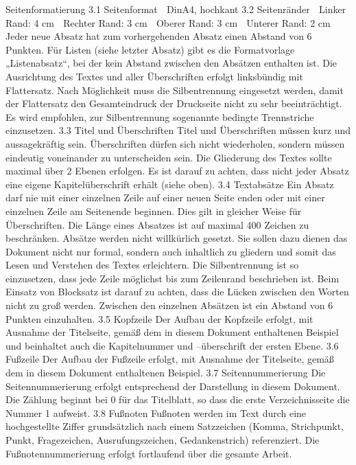 	Seitenformatierung
	3.1	Seitenformat
		DinA4, hochkant
	3.2	Seitenränder
		Linker Rand:   4 cm
		Rechter Rand:   3 cm
		Oberer Rand:   3 cm
		Unterer Rand:   2 cm
	Jeder neue Absatz hat zum vorhergehenden Absatz einen Abstand von 6 Punkten. Für Listen (siehe letzter Absatz) gibt es die Formatvorlage „Listenabsatz“, bei der kein Abstand zwischen den Absätzen enthalten ist.
	Die Ausrichtung des Textes und aller Überschriften erfolgt linksbündig mit Flattersatz. Nach Möglichkeit muss die Silbentrennung eingesetzt werden, damit der Flattersatz den Gesamteindruck der Druckseite nicht zu sehr beeinträchtigt. Es wird empfohlen, zur Silbentrennung sogenannte bedingte Trennstriche einzusetzen.
	3.3	Titel und Überschriften
	Titel und Überschriften müssen kurz und aussagekräftig sein. Überschriften dürfen sich nicht wiederholen, sondern müssen eindeutig voneinander zu unterscheiden sein.
	Die Gliederung des Textes sollte maximal über 2 Ebenen erfolgen. Es ist darauf zu achten, dass nicht jeder Absatz eine eigene Kapitelüberschrift erhält (siehe oben).
	3.4	Textabsätze
	Ein Absatz darf nie mit einer einzelnen Zeile auf einer neuen Seite enden oder mit einer einzelnen Zeile am Seitenende beginnen. Dies gilt in gleicher Weise für Überschriften.
	Die Länge eines Absatzes ist auf maximal 400 Zeichen zu beschränken.
	Absätze werden nicht willkürlich gesetzt. Sie sollen dazu dienen das Dokument nicht nur formal, sondern auch inhaltlich zu gliedern und somit das Lesen und Verstehen des Textes erleichtern.
	Die Silbentrennung ist so einzusetzen, dass jede Zeile möglichst bis zum Zeilenrand beschrieben ist. Beim Einsatz von Blocksatz ist darauf zu achten, dass die Lücken zwischen den Worten nicht zu groß werden.
	Zwischen den einzelnen Absätzen ist ein Abstand von 6 Punkten einzuhalten.
	3.5	Kopfzeile
	Der Aufbau der Kopfzeile erfolgt, mit Ausnahme der Titelseite, gemäß dem in diesem Dokument enthaltenen Beispiel und beinhaltet auch die Kapitelnummer und –überschrift der ersten Ebene.
	3.6	Fußzeile
	Der Aufbau der Fußzeile erfolgt, mit Ausnahme der Titelseite, gemäß dem in diesem Dokument enthaltenen Beispiel.
	3.7	Seitennummerierung
	Die Seitennummerierung erfolgt entsprechend der Darstellung in diesem Dokument. Die Zählung beginnt bei 0 für das Titelblatt, so dass die erste Verzeichnisseite die Nummer 1 aufweist.
	3.8	Fußnoten
	Fußnoten werden im Text durch eine hochgestellte Ziffer grundsätzlich nach einem Satzzeichen (Komma, Strichpunkt, Punkt, Fragezeichen, Ausrufungszeichen, Gedankenstrich) referenziert. Die Fußnotennummerierung erfolgt fortlaufend über die gesamte Arbeit.
